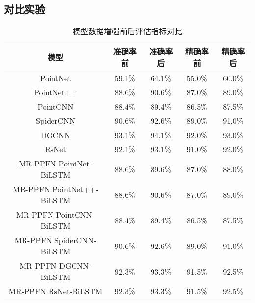\subsection{对比实验}
\begin{table}[h]
    \centering
    \caption{模型数据增强前后评估指标对比}
    \begin{tabular}{|c|c|c|c|c|}
        \hline
        \textbf{模型} & \textbf{准确率前} & \textbf{准确率后} & \textbf{精确率前} & \textbf{精确率后} \\ \hline
        PointNet & 59.1\% & 64.1\% & 55.0\% & 60.0\% \\ \hline
        PointNet++ & 88.6\% & 90.6\% & 87.0\% & 89.0\% \\ \hline
        PointCNN & 88.4\% & 89.4\% & 86.5\% & 87.5\% \\ \hline
        SpiderCNN & 90.6\% & 92.6\% & 89.0\% & 91.0\% \\ \hline
        DGCNN & 93.1\% & 94.1\% & 92.0\% & 93.0\% \\ \hline
        RsNet & 92.1\% & 93.1\% & 91.0\% & 92.0\% \\ \hline
        MR-PPFN PointNet-BiLSTM & 88.6\% & 89.6\% & 87.0\% & 88.0\% \\ \hline
        MR-PPFN PointNet++-BiLSTM & 88.6\% & 90.6\% & 87.0\% & 89.0\% \\ \hline
        MR-PPFN PointCNN-BiLSTM & 88.4\% & 89.4\% & 86.5\% & 87.5\% \\ \hline
        MR-PPFN SpiderCNN-BiLSTM & 90.6\% & 92.6\% & 89.0\% & 91.0\% \\ \hline
        MR-PPFN DGCNN-BiLSTM & 92.3\% & 93.3\% & 91.5\% & 92.5\% \\ \hline
        MR-PPFN RsNet-BiLSTM & 92.3\% & 93.3\% & 91.5\% & 92.5\% \\ \hline
    \end{tabular}
    \label{tab:model-comparison}
\end{table}
 



